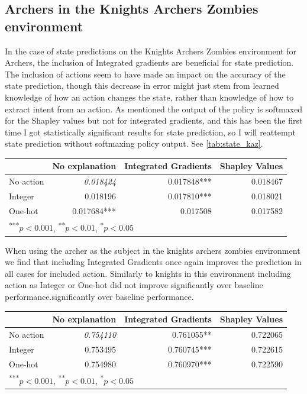 \documentclass[UKenglish]{uiomasterthesis}
\begin{document}
\subsection{Archers in the Knights Archers Zombies environment}

In the case of state predictions on the Knights Archers Zombies environment for Archers, the inclusion of Integrated gradients are beneficial for state prediction. The inclusion of actions seem to have made an impact on the accuracy of the state prediction, though this decrease in error might just stem from learned knowledge of how an action changes the state, rather than knowledge of how to extract intent from an action. As mentioned the output of the policy is softmaxed for the Shapley values but not for integrated gradients, and this has been the first time I got statistically significant results for state prediction, so I will reattempt state prediction without softmaxing policy output. See \cref{tab:state_kaz}.

\begin{center}
\label{tab:state_kaz}
\begin{tabular}{lrrr}
\toprule
 & No explanation & Integrated Gradients & Shapley Values \\
\midrule
    No action & \textit{0.018424} & 0.017848*** & 0.018467 \\
Integer & 0.018196 & 0.017810*** & 0.018021 \\
One-hot & 0.017684*** & 0.017508 & 0.017582 \\
\bottomrule
\multicolumn{3}{l}{\textsuperscript{***}$p<0.001$, 
  \textsuperscript{**}$p<0.01$, 
  \textsuperscript{*}$p<0.05$}
\end{tabular}
\end{center}

When using the archer as the subject in the knights archers zombies environment we find that including Integrated Gradients once again improves the prediction in all cases for included action. Similarly to knights in this environment including action as Integer or One-hot did not improve significantly over baseline performance.significantly over baseline performance.

\begin{center}
\label{tab:event_kaz_arch}
\begin{tabular}{lrrr}
\toprule
 & No explanation & Integrated Gradients & Shapley Values \\
\midrule
No action & \textit{0.754110} & 0.761055** & 0.722065 \\
Integer & 0.753495 & 0.760745*** & 0.722615 \\
One-hot & 0.754980 & 0.760970*** & 0.722590 \\
\bottomrule
\multicolumn{3}{l}{\textsuperscript{***}$p<0.001$, 
  \textsuperscript{**}$p<0.01$, 
  \textsuperscript{*}$p<0.05$}
\end{tabular}
\end{center}
\end{document}
